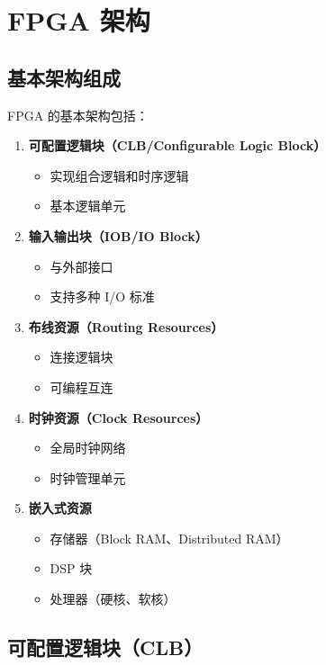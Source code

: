 \section{FPGA 架构}

\subsection{基本架构组成}

FPGA 的基本架构包括：

\begin{enumerate}
  \item \textbf{可配置逻辑块（CLB/Configurable Logic Block）}
    \begin{itemize}
      \item 实现组合逻辑和时序逻辑
      \item 基本逻辑单元
    \end{itemize}

  \item \textbf{输入输出块（IOB/IO Block）}
    \begin{itemize}
      \item 与外部接口
      \item 支持多种 I/O 标准
    \end{itemize}

  \item \textbf{布线资源（Routing Resources）}
    \begin{itemize}
      \item 连接逻辑块
      \item 可编程互连
    \end{itemize}

  \item \textbf{时钟资源（Clock Resources）}
    \begin{itemize}
      \item 全局时钟网络
      \item 时钟管理单元
    \end{itemize}

  \item \textbf{嵌入式资源}
    \begin{itemize}
      \item 存储器（Block RAM、Distributed RAM）
      \item DSP 块
      \item 处理器（硬核、软核）
    \end{itemize}
\end{enumerate}

\subsection{可配置逻辑块（CLB）}

